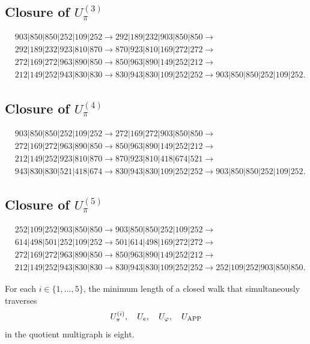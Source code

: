 \subsection{Closure of \texorpdfstring{\(U_\pi^{(3)}\)}{U-pi 3}}
\begin{align*}
&903|850|850|252|109|252\to
292|189|232|903|850|850\to\\
&292|189|232|923|810|870\to
870|923|810|169|272|272\to\\
&272|169|272|963|890|850\to
850|963|890|149|252|212\to\\
&212|149|252|943|830|830\to
830|943|830|109|252|252\to
903|850|850|252|109|252.
\end{align*}

\subsection{Closure of \texorpdfstring{\(U_\pi^{(4)}\)}{U-pi 4}}
\begin{align*}
&903|850|850|252|109|252\to
272|169|272|903|850|850\to\\
&272|169|272|963|890|850\to
850|963|890|149|252|212\to\\
&212|149|252|923|810|870\to
870|923|810|418|674|521\to\\
&943|830|830|521|418|674\to
830|943|830|109|252|252\to
903|850|850|252|109|252.
\end{align*}

\subsection{Closure of \texorpdfstring{\(U_\pi^{(5)}\)}{U-pi 5}}
\begin{align*}
&252|109|252|903|850|850\to
903|850|850|252|109|252\to\\
&614|498|501|252|109|252\to
501|614|498|169|272|272\to\\
&272|169|272|963|890|850\to
850|963|890|149|252|212\to\\
&212|149|252|943|830|830\to
830|943|830|109|252|252\to
252|109|252|903|850|850.
\end{align*}

\begin{theorem}
\label{gfp:b:thm:minimalidad-cierres-pi-autonoma}
For each \(i\in\{1,\ldots,5\}\), the minimum length of a closed walk
that simultaneously traverses
\[
 U_\pi^{(i)},\quad U_e,\quad U_\varphi,\quad U_{\rm APP}
\]
in the quotient multigraph is eight.
\end{theorem}

